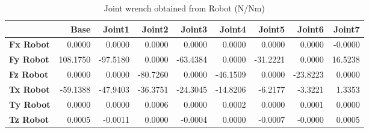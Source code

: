 \begin{table}[h!]
	\centering
	\caption{Joint wrench obtained from Robot (N/Nm)}
	\label{wrech_Robot_Pose11}
	\begin{tabular}{|l|r|r|r|r|r|r|r|r|}
		\hline
		\textbf{} & \textbf{Base} & \textbf{Joint1}  & \textbf{Joint2}  & \textbf{Joint3}  & \textbf{Joint4}  & \textbf{Joint5}  & \textbf{Joint6}  & \textbf{Joint7} \\ \hline
		\textbf{Fx Robot}  & 0.0000        & 0.0000        & 0.0000        & 0.0000        & 0.0000        & 0.0000        & 0.0000        & -0.0000 \\ \hline
		\textbf{Fy Robot}  & 108.1750        & -97.5180        & 0.0000        & -63.4384        & 0.0000        & -31.2221        & 0.0000        & 16.5238 \\ \hline
		\textbf{Fz Robot}  & 0.0000        & 0.0000        & -80.7260        & 0.0000        & -46.1509        & 0.0000        & -23.8223        & 0.0000 \\ \hline
		\textbf{Tx Robot}  & -59.1388        & -47.9403        & -36.3751        & -24.3045        & -14.8206        & -6.2177        & -3.3221        & 1.3353 \\ \hline
		\textbf{Ty Robot}  & 0.0000        & 0.0000        & 0.0006        & 0.0000        & 0.0002        & 0.0000        & 0.0001        & 0.0000 \\ \hline
		\textbf{Tz Robot}  & 0.0005        & -0.0011        & 0.0000        & -0.0004        & 0.0000        & -0.0007        & -0.0000        & 0.0005 \\ \hline
	\end{tabular}
\end{table}

